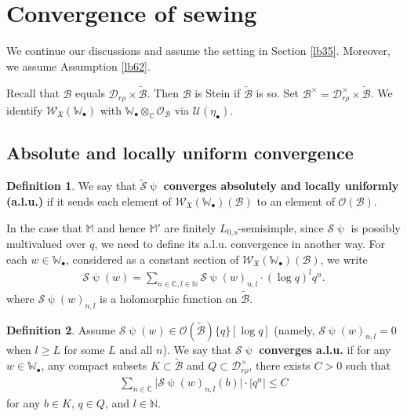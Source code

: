\documentclass[11pt,b5paper,notitlepage]{article}
\theoremstyle{definition}
\newtheorem{df}{Definition}[section]
\theoremstyle{plain}
\newcommand{\fk}{\mathfrak}
\newcommand{\mc}{\mathcal}
\newcommand{\wtd}{\widetilde}
\newcommand{\scr}{\mathscr}
\newcommand{\blt}{\bullet}
\newcommand{\Wbb}{\mathbb W}
\newcommand{\Mbb}{\mathbb M}
\newcommand{\Cbb}{\mathbb C}
\newcommand{\Nbb}{\mathbb N}
\newcommand{\Lss}{{L_{0,\mathrm{s}}}}
\numberwithin{equation}{section}
\begin{document}
\section{Convergence of sewing}\label{lb52}




We continue our discussions and assume the setting in Section \ref{lb35}. Moreover, we assume Assumption \ref{lb62}.

Recall that $\mc B$ equals $\mc D_{r\rho}\times\wtd{\mc B}$. Then $\mc B$ is Stein if  $\wtd{\mc B}$ is so. Set $\mc B^\times=\mc D_{r\rho}^\times\times\wtd{\mc B}$. \index{B@$\mc B^\times$} We identify $\scr W_{\fk X}(\Wbb_\blt)$ with $\Wbb_\blt\otimes_\Cbb\scr O_{\mc B}$ via $\mc U(\eta_\blt)$.



\subsection*{Absolute and locally uniform convergence}



\begin{df}
We say that $\wtd{\mc S}\uppsi$  \textbf{converges absolutely and locally uniformly (a.l.u.)} if it sends each element of $\scr W_{\fk X}(\Wbb_\blt)(\mc B)$ to an element of $\scr O(\mc B)$. 
\end{df}







In the case that $\Mbb$ and hence $\Mbb'$ are finitely $\Lss$-semisimple, since $\mc S\uppsi$ is possibly multivalued over $q$, we need to define its a.l.u. convergence in another way. For each $w\in \Wbb_\blt$, considered as a constant section of $\scr W_{\fk X}(\Wbb_\blt)(\mc B)$, we write
\begin{align*}
\mc S\uppsi(w)=\sum_{n\in \Cbb,l\in\Nbb}\mc S\uppsi(w)_{n,l}\cdot (\log q)^lq^n.
\end{align*}
where  $\mc S\uppsi(w)_{n,l}$ is a holomorphic function on $\wtd{\mc B}$. 


\begin{df}\label{lb37}
Assume $\mc S\uppsi(w)\in\scr O(\wtd{\mc B})\{q\}[\log q]$ (namely, $\mc S\uppsi(w)_{n,l}=0$ when $l\geq L$ for some $L$ and all $n$). We say that $\mc S\uppsi$ \textbf{converges a.l.u.} if  for any $w\in\Wbb_\blt$, any compact subsets $K\subset\wtd{\mc B}$ and $Q\subset\mc D_{r\rho}^\times$,  there exists $C>0$ such that
\begin{align}
	\sum_{n\in\Cbb}\big|\mc S\uppsi(w)_{n,l}(b)\big|\cdot |q^{n}|\leq C
\end{align}
for any $b\in K$, $q\in Q$, and $l\in\Nbb$. 
\end{df} 
\end{document}
